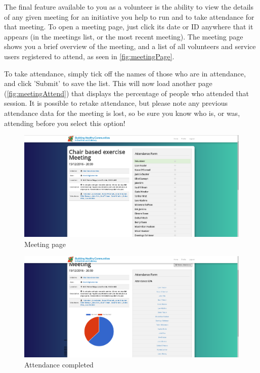 \documentclass{bhcguides}
\begin{document}
The final feature available to you as a volunteer is the ability to view the details of any given meeting for an initiative you help to run and to take attendance for that meeting. To open a meeting page, just click its date or ID anywhere that it appears (in the meetings list, or the most recent meeting). The meeting page shows you a brief overview of the meeting, and a list of all volunteers and service users registered to attend, as seen in \autoref{fig:meetingPage}.

To take attendance, simply tick off the names of those who are in attendance, and click 'Submit' to save the list. This will now load another page (\autoref{fig:meetingAttend}) that displays the percentage of people who attended that session. It is possible to retake attendance, but please note any previous attendance data for the meeting is lost, so be sure you know who is, or was, attending before you select this option!

\pagebreak

\begin{figure}[h]
 \centerline{\includegraphics[width=\textwidth, height=\textheight, keepaspectratio]{meetingpage.png}}
 \caption{Meeting page}
 \label{fig:meetingPage}
\end{figure}

\begin{figure}[h]
 \centerline{\includegraphics[width=\textwidth, height=\textheight, keepaspectratio]{meetingattendance.png}}
 \caption{Attendance completed}
 \label{fig:meetingAttend}
\end{figure}
\end{document}
